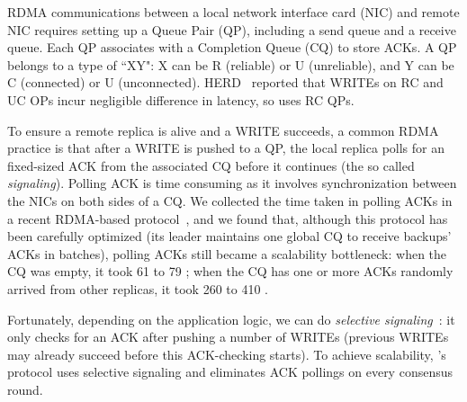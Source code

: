 RDMA communications between a local network interface card (NIC) and remote NIC 
requires setting up a Queue Pair (QP), including a send queue and a receive 
queue. Each QP associates with a Completion Queue (CQ) to store ACKs. A QP 
belongs to a type of ``XY": X can be R (reliable) or U (unreliable), and Y can 
be C (connected) or U (unconnected). HERD~\cite{herd:sigcomm14} reported that 
WRITEs on RC and UC OPs incur negligible difference in latency, so \xxx uses RC 
QPs.




To ensure a remote replica is alive and a WRITE succeeds, a common RDMA 
practice is that after a WRITE is pushed to a QP, the local replica polls
for an fixed-sized ACK from the associated CQ before it continues (the so 
called \emph{signaling}). Polling ACK is time consuming as it involves 
synchronization between the NICs on both sides of a CQ. We collected the time 
taken in polling ACKs in a recent RDMA-based \paxos protocol~\cite{dare:hpdc15}, 
and we found that, although this protocol has been carefully optimized (its 
leader maintains one global CQ to receive backups' ACKs in batches), polling 
ACKs still became a scalability bottleneck: when the CQ was empty, it took 61 to 
79 \us; when the CQ has one or more ACKs randomly arrived from other replicas, 
it took 260 to 410 \us.


Fortunately, depending on the application logic, we can do \emph{selective 
signaling}~\cite{herd:sigcomm14}: it only checks for an ACK after pushing a 
number of WRITEs (previous WRITEs may already succeed before this ACK-checking 
starts). To achieve scalability, \xxx's protocol uses selective signaling and 
eliminates ACK pollings on every consensus round.


